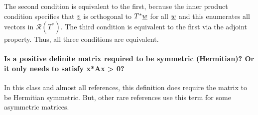 \documentclass[10pt,english]{article}
\begin{document}
The second condition is equivalent to the first, because the inner product condition specifies that $\underline{v}$ is orthogonal to $T^* \underline{w}$ for all $\underline{w}$ and this enumerates all vectors in $\mathcal{R}(T^*)$.
The third condition is equivalent to the first via the adjoint property.
Thus, all three conditions are equivalent.




\paragraph{Is a positive definite matrix required to be symmetric (Hermitian)? Or it only needs to satisfy x*Ax > 0?}

In this class and almost all references, this definition does require the matrix to be Hermitian symmetric.
But, other rare references use this term for some asymmetric matrices.
\end{document}
